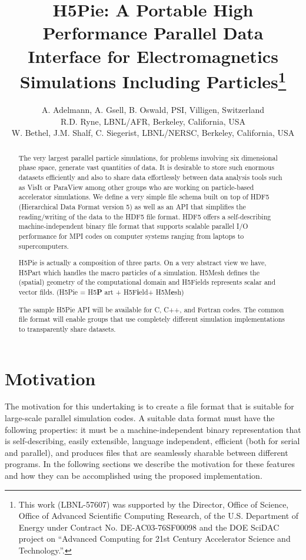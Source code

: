 \documentclass[acus]{JAC2003}
\begin{document}
\title{H5Pie: A Portable High Performance Parallel Data Interface for Electromagnetics Simulations Including Particles\thanks{
This work (LBNL-57607) was supported by the Director, Office of Science, Office of Advanced Scientific Computing Research, of the U.S. Department of Energy under Contract No. DE-AC03-76SF00098 and the DOE SciDAC project on ``Advanced Computing for 21st Century Accelerator Science and Technology.''.
}}

\author{A. Adelmann, A. Gsell, B. Oswald, PSI, Villigen, Switzerland \\ 
        R.D. Ryne, LBNL/AFR, Berkeley, California, USA\\
        W. Bethel, J.M. Shalf, C. Siegerist, LBNL/NERSC, Berkeley, California, USA}

\maketitle
\begin{abstract}
The very largest parallel particle simulations, for problems 
involving six dimensional phase space,
generate vast quantities of data. It is desirable to 
store such enormous datasets efficiently and also to share data 
effortlessly between data analysis tools 
such as VisIt or ParaView
among other groups who are working on particle-based accelerator
simulations. We define a very simple file schema built on top of HDF5~\cite{hdf5hp}
(Hierarchical Data Format version 5) as well as an API that simplifies
the reading/writing of the data to the HDF5 file format. HDF5 offers a
self-describing machine-independent binary file format that supports
scalable parallel I/O performance for MPI codes on computer systems
ranging from laptops to supercomputers. 

H5Pie is actually a composition of three parts. On a very abstract view we have,
H5Part  which handles the macro particles of a simulation. H5Mesh defines the (spatial) geometry of the
computational domain and H5Fields represents scalar and vector filds. (H5Pie = H5{\bf P} art + H5F{\bf i}eld+ H5M{\bf e}sh)


The sample H5Pie
API will be available for C, C++, and Fortran codes. 
The common file format will enable groups that
use completely different simulation implementations to transparently share
datasets.
\end{abstract}

\section{Motivation}
The motivation for this undertaking is to create a file format that is
suitable for large-scale parallel simulation codes.   
A suitable data format must have the following properties: 
it must be a machine-independent binary representation that is 
self-describing, easily extensible, language independent, efficient
(both for serial and parallel), and produces files that are seamlessly sharable
between different programs.  In the following sections we describe 
the motivation for these features and how they can be accomplished
using the proposed implementation.
\end{document}
